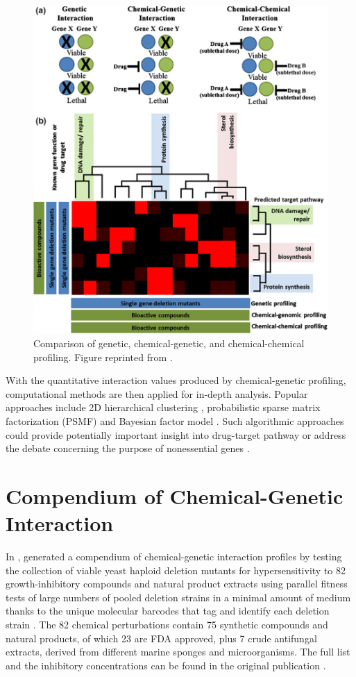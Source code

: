 \documentclass[12pt,fullpage,singlespace]{article}
\begin{document}
\begin{figure}
\centering
\includegraphics[width=\linewidth]{1082-1.png}
\caption{Comparison of genetic, chemical-genetic, and chemical-chemical profiling. Figure reprinted from \citep{1082}.}
\label{fig:1082-1}
\end{figure}

With the quantitative interaction values produced by chemical-genetic profiling, computational methods are then applied for in-depth analysis. Popular approaches include 2D hierarchical clustering \citep{1078,1079,1080}, probabilistic sparse matrix factorization (PSMF) \citep{1078} and Bayesian factor model \citep{1079}. Such algorithmic approaches could provide potentially important insight into drug-target pathway \citep{1078,1079} or address the debate concerning the purpose of nonessential genes \citep{1080}.

\section{Compendium of Chemical-Genetic Interaction}

In \citeyear{1078},  generated a compendium of chemical-genetic interaction profiles by testing the collection of viable yeast haploid deletion mutants for hypersensitivity to 82 growth-inhibitory compounds and natural product extracts using parallel fitness tests of large numbers of pooled deletion strains in a minimal amount of medium thanks to the unique molecular barcodes that tag and identify each deletion strain \citep{1078}. The 82 chemical perturbations contain 75 synthetic compounds and natural products, of which 23 are FDA approved, plus 7 crude antifungal extracts, derived from different marine sponges and microorganisms. The full list and the inhibitory concentrations can be found in the original publication \citep{1078}.
\end{document}
